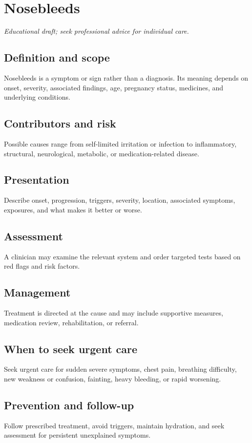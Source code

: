\chapter{Nosebleeds}

\medskip
\noindent\textit{Educational draft; seek professional advice for individual care.}

\section*{Definition and scope}
Nosebleeds is a symptom or sign rather than a diagnosis. Its meaning depends on onset, severity, associated findings, age, pregnancy status, medicines, and underlying conditions.

\section*{Contributors and risk}
Possible causes range from self-limited irritation or infection to inflammatory, structural, neurological, metabolic, or medication-related disease.

\section*{Presentation}
Describe onset, progression, triggers, severity, location, associated symptoms, exposures, and what makes it better or worse.

\section*{Assessment}
A clinician may examine the relevant system and order targeted tests based on red flags and risk factors.

\section*{Management}
Treatment is directed at the cause and may include supportive measures, medication review, rehabilitation, or referral.

\section*{When to seek urgent care}
Seek urgent care for sudden severe symptoms, chest pain, breathing difficulty, new weakness or confusion, fainting, heavy bleeding, or rapid worsening.

\section*{Prevention and follow-up}
Follow prescribed treatment, avoid triggers, maintain hydration, and seek assessment for persistent unexplained symptoms.

